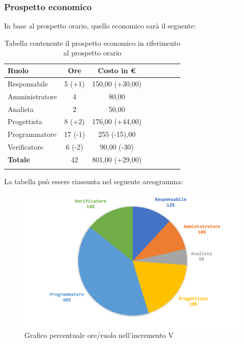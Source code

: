 		\subsubsection{Prospetto economico}
			In base al prospetto orario, quello economico sarà il seguente: 
			
			\begin{longtable}{|l|c|c|c|c|c|c|c|}
				\hline
				\rowcolor{lighter-grayer}
				\textbf{Ruolo} & \textbf{Ore} & \textbf{Costo in €} \\
				\hline
				\endfirsthead
				\hline
				Responsabile 	    & 5 (+1) & 150,00 (+30,00)\\
				\hline 
				\hline
				Amministratore	  & 4 & 80,00\\
				\hline
				\hline
				Analista 				& 2 & 50,00\\
				\hline
				\hline
				Progettista 		  & 8 (+2) & 176,00 (+44,00)\\
				\hline
				\hline
				Programmatore 	 & 17 (-1)  & 255 (-15),00 \\
				\hline
				\hline
				Verificatore 		  & 6 (-2) & 90,00 (-30)\\
				\hline
				\textbf{Totale} 	&  42 & 801,00 (+29,00)\\
				\hline
					
				\caption{Tabella contenente il prospetto economico in riferimento al prospetto orario}
			\end{longtable}
			
			La tabella può essere riassunta nel seguente areogramma:
			\begin{figure}[H]
				\centering
				\includegraphics[width=0.8\linewidth]{images/consuntivo/ConsIncr5-2.png}
				\caption{Grafico percentuale ore/ruolo nell'incremento V}
				\label{fig:consuntivo grafico costi ruolo incremento V}
			\end{figure}
		\pagebreak


